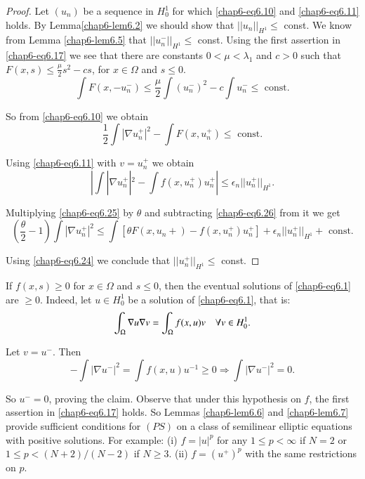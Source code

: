 \begin{proof}
Let $(u_{n})$ be a sequence in $H^{1}_{0}$ for which
\eqref{chap6-eq6.10} and \eqref{chap6-eq6.11} holds. By
Lemma\pageoriginale \ref{chap6-lem6.2} we should show that
$||u_{n}||_{H^{1}}\leq $ const. We know from Lemma \ref{chap6-lem6.5}
that $||u^{-}_{n}||_{H^{1}}\leq$ const. Using the first assertion in
\eqref{chap6-eq6.17} we see that there are constants
$0<\mu<\lambda_{1}$ and $c>0$ such that $F(x,s)\leq
\frac{\mu}{2}s^{2}-cs$, for $x\in \Omega$ and $s\leq 0$.
$$
\int F(x,-u^{-}_{n})\leq \frac{\mu}{2}\int (u^{-}_{n})^{2}-c\int
u^{-}_{n}\leq \text{~const.}
$$

So from \eqref{chap6-eq6.10} we obtain
\begin{equation*}
\frac{1}{2}\int |\nabla u^{+}_{n}|^{2}-\int F(x,u^{+}_{n})\leq
\text{~const.}\tag{6.25}\label{chap6-eq6.25} 
\end{equation*}

Using \eqref{chap6-eq6.11} with $v=u^{+}_{n}$ we obtain
\begin{equation*}
|\int |\nabla u^{+}_{n}|^{2}-\int f(x,u^{+}_{n})u^{+}_{n}|\leq
\epsilon_{n}||u^{+}_{n}||_{H^{1}}.\tag{6.26}\label{chap6-eq6.26} 
\end{equation*}

Multiplying \eqref{chap6-eq6.25} by $\theta$ and subtracting
\eqref{chap6-eq6.26} from it we get
$$
\left(\frac{\theta}{2}-1\right)\int |\nabla u^{+}_{n}|^{2}\leq \int
[\theta
  F(x,u_{n}+)-f(x,u^{+}_{n})u^{+}_{n}]+\epsilon_{n}||u^{+}_{n}||_{H^{1}}+\text{~const.} 
$$

Using \eqref{chap6-eq6.24} we conclude that
$||u^{+}_{n}||_{H^{1}}\leq$ const.
\end{proof}

\begin{remark*}
If $f(x,s)\geq 0$ for $x\in \Omega$ and $s\leq 0$, then the eventual
solutions of \eqref{chap6-eq6.1} are $\geq 0$. Indeed, let $u\in
H^{1}_{0}$ be a solution of \eqref{chap6-eq6.1}, that is:
$$
\int_{\Omega}\nabla u \nabla v=\int_{\Omega}f(x,u)v\quad \forall v\in
H^{1}_{0}. 
$$

Let $v=u^{-}$. Then
$$
-\int |\nabla u^{-}|^{2}=\int f(x,u)u^{-1}\geq 0\Rightarrow \int
|\nabla u^{-}|^{2}=0. 
$$

So $u^{-}=0$, proving the claim. Observe that under this hypothesis on
$f$, the first assertion in \eqref{chap6-eq6.17} holds. So Lemmas
\ref{chap6-lem6.6} and \ref{chap6-lem6.7} provide sufficient
conditions for $(PS)$ on a class of semilinear elliptic equations with
positive solutions. For example: (i) $f=|u|^{p}$ for any $1\leq
p<\infty$ if $N=2$ or $1\leq p<(N+2)/(N-2)$ if $N\geq 3$. (ii)
$f=(u^{+})^{p}$ with the same restrictions on $p$. 
\end{remark*}

